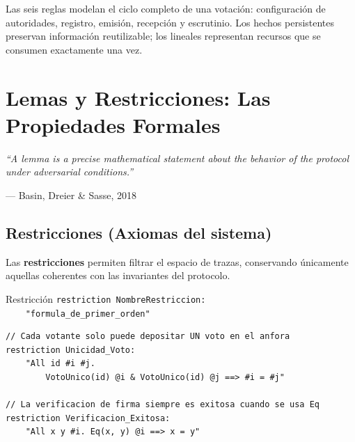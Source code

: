 \documentclass[12pt, a4paper, twoside, openright]{book}
\begin{document}
\begin{cajaResumen}
  Las seis reglas modelan el ciclo completo de una votaci\'on: configuraci\'on
  de autoridades, registro, emisi\'on, recepci\'on y escrutinio. Los hechos
  persistentes preservan informaci\'on reutilizable; los lineales representan
  recursos que se consumen exactamente una vez.
\end{cajaResumen}

\chapter{Lemas y Restricciones: Las Propiedades Formales}

\epigraph{%
  \textit{``A lemma is a precise mathematical statement about the
  behavior of the protocol under adversarial conditions.''}
}{--- Basin, Dreier \& Sasse, 2018}

\section{Restricciones (Axiomas del sistema)}

Las \textbf{restricciones} permiten filtrar el espacio de trazas,
conservando \'unicamente aquellas coherentes con las invariantes del
protocolo.

\begin{cajaSintaxis}{Restricci\'on}
  \texttt{restriction NombreRestriccion:}\\
  \texttt{\ \ \ \ "formula\_de\_primer\_orden"}
\end{cajaSintaxis}

\begin{lstlisting}[caption={Restricciones del protocolo de votaci\'on.}]
// Cada votante solo puede depositar UN voto en el anfora
restriction Unicidad_Voto:
    "All id #i #j.
        VotoUnico(id) @i & VotoUnico(id) @j ==> #i = #j"

// La verificacion de firma siempre es exitosa cuando se usa Eq
restriction Verificacion_Exitosa:
    "All x y #i. Eq(x, y) @i ==> x = y"
\end{lstlisting}
\end{document}
